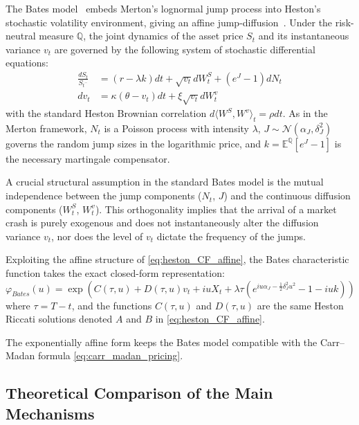 The Bates model~\cite{Bates1996} embeds Merton's lognormal jump process into Heston's stochastic volatility environment, giving an affine jump-diffusion~\cite{DuffiePanSingleton2000}. Under the risk-neutral measure $\mathbb{Q}$, the joint dynamics of the asset price $S_t$ and its instantaneous variance $v_t$ are governed by the following system of stochastic differential equations:
\begin{equation}\label{eq:bates_dynamics}
    \begin{aligned}
        \frac{dS_t}{S_{t^-}} &= (r - \lambda k) dt + \sqrt{v_t} dW_t^S + (e^J - 1) dN_t \\
        dv_t &= \kappa(\theta - v_t) dt + \xi \sqrt{v_t} dW_t^v
    \end{aligned}
\end{equation}
with the standard Heston Brownian correlation $d\langle W^S, W^v \rangle_t = \rho dt$. As in the Merton framework, $N_t$ is a Poisson process with intensity $\lambda$, $J \sim \mathcal{N}(\alpha_J, \delta_J^2)$ governs the random jump sizes in the logarithmic price, and $k = \mathbb{E}^{\mathbb{Q}}[e^J - 1]$ is the necessary martingale compensator.

A crucial structural assumption in the standard Bates model is the mutual independence between the jump components ($N_t$, $J$) and the continuous diffusion components ($W_t^S$, $W_t^v$). This orthogonality implies that the arrival of a market crash is purely exogenous and does not instantaneously alter the diffusion variance $v_t$, nor does the level of $v_t$ dictate the frequency of the jumps. 


Exploiting the affine structure of \eqref{eq:heston_CF_affine}, the Bates characteristic function takes the exact closed-form representation:
\begin{equation}\label{eq:bates_cf}
    \varphi_{Bates}(u) = \exp \left( C(\tau, u) + D(\tau, u) v_t + iu X_t + \lambda \tau \left( e^{iu\alpha_J - \frac{1}{2}\delta_J^2 u^2} - 1 - iu k \right) \right)
\end{equation}
where $\tau = T - t$, and the functions $C(\tau, u)$ and $D(\tau, u)$ are the same Heston Riccati solutions denoted $A$ and $B$ in \eqref{eq:heston_CF_affine}.

The exponentially affine form keeps the Bates model compatible with the Carr--Madan formula \eqref{eq:carr_madan_pricing}.

\subsection{Theoretical Comparison of the Main Mechanisms}\label{sec:model-comparison}

